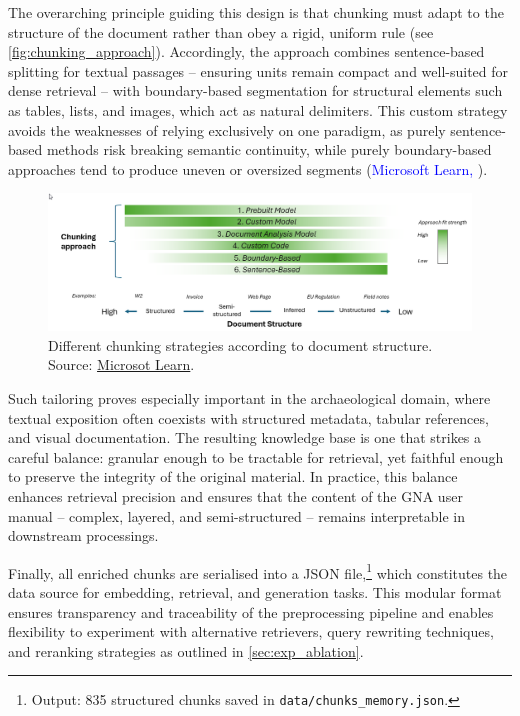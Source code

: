 \begin{spacing}{1.5}
The overarching principle guiding this design is that chunking must adapt to the structure of the document rather than obey a rigid, uniform rule (see \autoref{fig:chunking_approach}). Accordingly, the approach combines sentence-based splitting for textual passages -- ensuring units remain compact and well-suited for dense retrieval -- with boundary-based segmentation for structural elements such as tables, lists, and images, which act as natural delimiters. This custom strategy avoids the weaknesses of relying exclusively on one paradigm, as purely sentence-based methods risk breaking semantic continuity, while purely boundary-based approaches tend to produce uneven or oversized segments (\textcolor{blue}{Microsoft Learn,} \citeyear{noauthor_develop_2025}).

\vspace{0.8em}
\begin{figure}[H]
  \centering
  \includegraphics[width=\textwidth]{images/chunking-approaches-by-document-structure.png} 
  \caption{Different chunking strategies according to document structure.\\
  \footnotesize{Source: \href{https://web.archive.org/web/20250825093743/https://learn.microsoft.com/en-us/azure/architecture/ai-ml/guide/rag/rag-chunking-phase}{Microsot Learn}}.}
  \label{fig:chunking_approach}
\end{figure}

Such tailoring proves especially important in the archaeological domain, where textual exposition often coexists with structured metadata, tabular references, and visual documentation. The resulting knowledge base is one that strikes a careful balance: granular enough to be tractable for retrieval, yet faithful enough to preserve the integrity of the original material. In practice, this balance enhances retrieval precision and ensures that the content of the GNA user manual -- complex, layered, and semi-structured -- remains interpretable in downstream processings.

Finally, all enriched chunks are serialised into a JSON file,\footnote{Output: 835 structured chunks saved in \texttt{data/chunks\_memory.json}.} which constitutes the data source for embedding, retrieval, and generation tasks. This modular format ensures transparency and traceability of the preprocessing pipeline and enables flexibility to experiment with alternative retrievers, query rewriting techniques, and reranking strategies as outlined in \autoref{sec:exp_ablation}.


\end{spacing}
